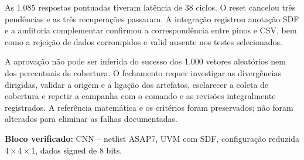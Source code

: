 \documentclass[12pt,a4paper]{article}
\begin{document}
As 1.085 respostas pontuadas tiveram latência de 38 ciclos. O reset cancelou três pendências e as três recuperações passaram. A integração registrou anotação SDF e a auditoria complementar confirmou a correspondência entre pinos e CSV, bem como a rejeição de dados corrompidos e valid ausente nos testes selecionados.

A aprovação não pode ser inferida do sucesso dos 1.000 vetores aleatórios nem dos percentuais de cobertura. O fechamento requer investigar as divergências dirigidas, validar a origem e a ligação dos artefatos, esclarecer a coleta de cobertura e repetir a campanha com o comando e as revisões integralmente registrados. A referência matemática e os critérios foram preservados; não foram alterados para eliminar as falhas documentadas.

\vfill
\begin{center}\textbf{Bloco verificado:} CNN -- netlist ASAP7, UVM com SDF, configuração reduzida $4\times4\times1$, dados signed de 8 bits.\end{center}
\end{document}
